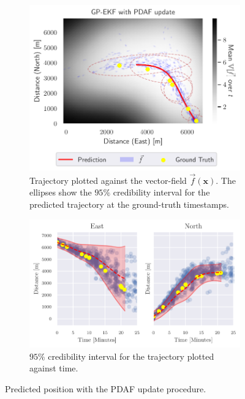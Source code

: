 \begin{figure}
    \centering
    \begin{subfigure}{\textwidth}
        \centering
        \includegraphics[width=\textwidth]{figures/dyngp/gp_ekf_with_pdaf.pdf}
        \caption{Trajectory plotted against the vector-field $\vec{f}(\boldsymbol{x})$. The ellipses show the $95\%$ credibility interval for the predicted trajectory at the ground-truth timestamps.}
    \end{subfigure}
    \begin{subfigure}{\textwidth}
        \centering
        \includegraphics[width=\textwidth]{figures/dyngp/gp_ekf_with_pdaf_state.pdf}
        \caption{$95\%$ credibility interval for the trajectory plotted against time.}
    \end{subfigure}
    \caption{Predicted position with the PDAF update procedure.}
    \label{fig:gp_ekf_with_pdaf}
\end{figure}

